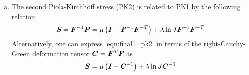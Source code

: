\begin{enumerate}[(a)]
{\begin{prf}{prf:final1_trace_id}
To show \cref{eqn:final1_trace_id}, we first note that 
\begin{equation}
    \trace{\bt{F}^T \bt{F}} = \delta_{ij} F_{ki} F_{kj} = F_{ki} F_{ki}
\end{equation}
and thus 
\begin{equation}
    \frac{\partial\trace{\bt{F}^T \bt{F}}}{\partial \bt{F}} = \frac{\partial (F_{kl} F_{kl})}{\partial F_{ij}} = 2 F_{ij} = 2\bt{F}
\end{equation}
The second identity \cref{eqn:final1_det_id} derives from the fact that 
\begin{equation}
    J = \det \bt{F} = \sum_{j=1}^{3} \cofactor{\bt{F}}_{ij} F_{ij}, ~~~~ i \in \{1, 2, 3\}
\end{equation}
where $\cofactor{\bt{F}}_{ij} = {(-1)}^{i+j} \tilde{J}_{ij}$ is the cofactor of $\bt{F}$, with $\tilde{J}_{ij}$ being the determinant of sub-matrix of $\bt{F}$ excluding the $i$-th row and $j$-th column.
Taking element-wise derivative with respect to $F_{ij}$:
\begin{equation}
    \frac{\partial J}{\partial F_{ij}} = \frac{\partial}{\partial F_{ij}} \left( \sum_{k=1}^{3} \cofactor{\bt{F}}_{ik} F_{ik}\right) = \cofactor{\bt{F}}_{ij}
\end{equation}
where we select the same row to represent $J$ as $F_{ij}$ such that the cofactors are independent of $F_{ij}$.
Since the adjoint matrix of $\bt{F}$ is $\adjoint{\bt{F}} = \cofactor{\bt{F}}^T$ and the inverse of $\bt{F}$ is $\bt{F}^{-1} = \adjoint{\bt{F}} / J$, we have
\begin{equation}
    \frac{\partial J}{\partial \bt{F}} = \cofactor{\bt{F}} = \adjoint{\bt{F}}^T = J \bt{F}^{-T}
\end{equation}
\end{prf}
}
\item {
The second Piola-Kirchhoff stress (PK2) is related to PK1 by the following relation:
\begin{equation}\label{eqn:final1_pk2}
    \bm{S} = \bm{F}^{-1} \bm{P} = \mu \left(\bm{I} - \bm{F}^{-1}\bm{F}^{-T}\right) + \lambda \ln{J} \bm{F}^{-1} \bm{F}^{-T}
\end{equation}
Alternatively, one can express \cref{eqn:final1_pk2} in terms of the right-Cauchy-Green deformation tensor $\bm{C} = \bm{F}^T \bm{F}$ as 
\begin{equation}
    \bt{S} = \mu \left(\bt{I} - \bt{C}^{-1}\right) + \lambda \ln{J} \bt{C}^{-1}

\end{equation}}
\end{enumerate}
